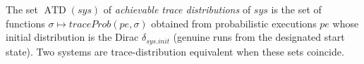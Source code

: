 \begin{definition}
  \label{def:achievable}
  \leanok
  The set $\operatorname{ATD}(sys)$ of \emph{achievable trace distributions} of
  $sys$ is the set of functions $\sigma \mapsto traceProb(pe, \sigma)$ obtained
  from probabilistic executions $pe$ whose initial distribution is the Dirac
  $\delta_{sys.init}$ (genuine runs from the designated start state). Two systems
  are trace-distribution equivalent when these sets coincide.
\end{definition}
